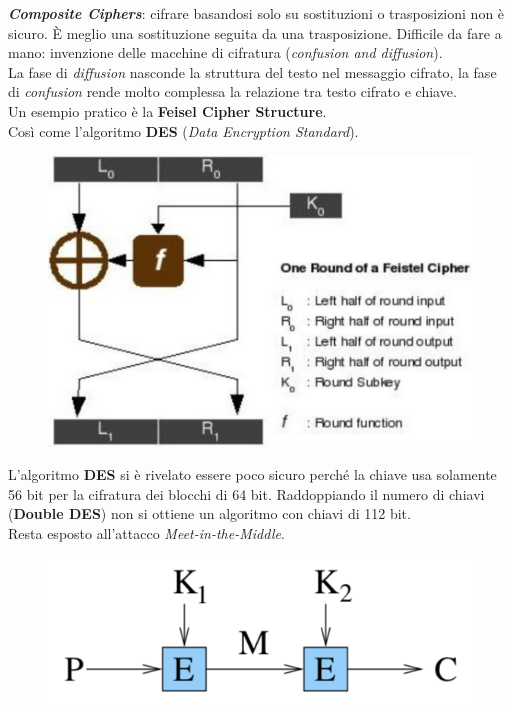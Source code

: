 \documentclass[11pt, a4paper, twoside, italian]{report}
\theoremstyle{plain}
\begin{document}
\begin{multicols}{2}
\noindent
\textit{\textbf{Composite Ciphers}}: cifrare basandosi solo su sostituzioni o trasposizioni non è sicuro. È meglio una sostituzione seguita da una trasposizione. Difficile da fare a mano: invenzione delle macchine di cifratura (\textit{confusion and diffusion}).
\\
La fase di \textit{diffusion} nasconde la struttura del testo nel messaggio cifrato, la fase di \textit{confusion} rende molto complessa la relazione tra testo cifrato e chiave.\\
Un esempio pratico è la \textbf{Feisel Cipher Structure}.\\
Così come l'algoritmo \textbf{DES} (\textit{Data Encryption Standard}).
\columnbreak
\begin{figure}[H]
	\centering
	\includegraphics[scale=0.45]{feistel}
\end{figure}
\end{multicols}

\begin{multicols}{2}
\noindent
L'algoritmo \textbf{DES} si è rivelato essere poco sicuro perché la chiave usa solamente 56 bit per la cifratura dei blocchi di 64 bit. Raddoppiando il numero di chiavi (\textbf{Double DES}) non si ottiene un algoritmo con chiavi di 112 bit.\\ Resta esposto all'attacco \textit{Meet-in-the-Middle}.
\columnbreak
\begin{figure}[H]
	\centering
	\includegraphics[scale=0.6]{doubleDES}
\end{figure}
\end{multicols}
\end{document}

